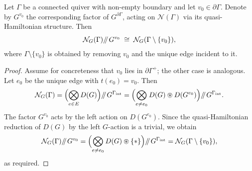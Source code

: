 \documentclass[10pt,a4paper]{amsart}
\newcommand{\N}{\mathcal{N}}
\newcommand{\sll}[1]{\mkern-4mu\mathbin{/\mkern-5mu/}_{\mkern-4mu{#1}}}
\begin{document}
\begin{Prop}\label{bij94btr}
Let \(\Gamma\) be a connected quiver with non-empty boundary and let
\(v_0 \in \partial\Gamma\).  Denote by \(G^{v_0}\) the corresponding
factor of \(G^{\partial\Gamma}\), acting on \(\N(\Gamma)\) via its
quasi-Hamiltonian structure.  Then
\[
    \N_G(\Gamma) \sll{} G^{v_0}
    \;\cong\;
    \N_G(\Gamma \setminus \{v_0\}),
\]
where \(\Gamma \setminus \{v_0\}\) is obtained by removing \(v_0\) and
the unique edge incident to it.
\end{Prop}

\begin{proof}
Assume for concreteness that \(v_0\) lies in \(\partial\Gamma^+\); the
other case is analogous.  Let \(e_0\) be the unique edge with
\(t(e_0)=v_0\).  Then
\[
    \N_G(\Gamma)
    =
    \Bigl(\bigotimes_{e\in E} D(G)\Bigr)
    \sll{} G^{\Gamma_{\mathrm{int}}}
    =
    \Bigl(\bigotimes_{e\neq e_0} D(G) \circledast D(G^{e_0})\Bigr)
    \sll{} G^{\Gamma_{\mathrm{int}}}.
\]
The factor \(G^{v_0}\) acts by the left action on \(D(G^{e_0})\).  Since
the quasi-Hamiltonian reduction of \(D(G)\) by the left \(G\)-action is a
trivial, we obtain
\[
    \N_G(\Gamma) \sll{} G^{v_0}
    =
    \Bigl(\bigotimes_{e\neq e_0} D(G) \circledast \{*\}\Bigr)
    \sll{} G^{\Gamma_{\mathrm{int}}}
    =
    \N_G(\Gamma \setminus \{v_0\}),
\]
as required.
\end{proof}
\end{document}
